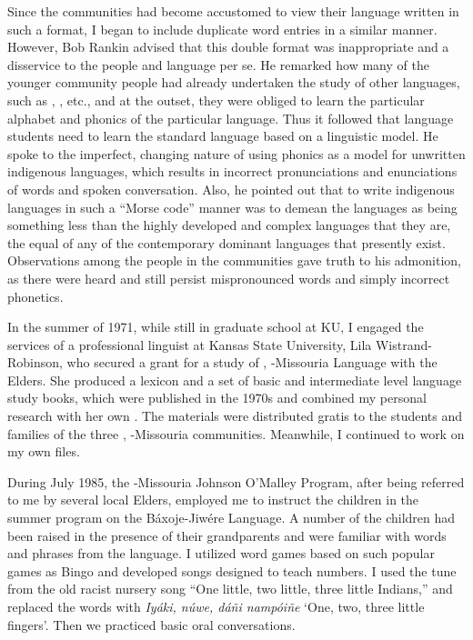 \documentclass[output=paper]{LSP/langsci}
\begin{document}
Since the communities had become accustomed to view their language written in such a format, I began to include duplicate  word entries in a similar manner. However, Bob Rankin advised that this double format was inappropriate and a disservice to the people and language per se. He remarked how many of the younger community people had already undertaken the study of other languages, such as , , etc., and at the outset, they were obliged to learn the particular alphabet and phonics of the particular language. Thus it followed that language students need to learn the standard language  based on a linguistic model. He spoke to the imperfect, changing nature of using  phonics as a model for unwritten indigenous languages, which results in incorrect pronunciations and enunciations of words and spoken conversation. Also, he pointed out that to write indigenous languages in such a ``Morse code'' manner was to demean the languages as being something less than the highly developed and complex languages that they are, the equal of any of the contemporary dominant languages that presently exist. Observations among the people in the communities gave truth to his admonition, as there were heard and still persist mispronounced words and simply incorrect phonetics. 

In the summer of 1971, while still in graduate school at KU, I engaged the services of a professional linguist at Kansas State University, Lila Wistrand-Robinson, who secured a grant for a study of , -Missouria Language with the Elders. She produced a lexicon and a set of basic and intermediate level language study books, which were published in the 1970s and combined my personal research with her own \citep{OtoeIowaWistrandRobinson1977,OtoeIowaWistrandRobinson1978}. The materials were distributed gratis to the students and families of the three , -Missouria communities. Meanwhile, I continued to work on my own  files.  

During July 1985, the -Missouria Johnson O'Malley Program, after being referred to me by several local Elders, employed me to instruct the children in the summer program on the Báxoje-Jiwére Language. A number of the children had been raised in the presence of their grandparents and were familiar with words and phrases from the language. I utilized word games based on such popular games as Bingo and developed songs designed to teach numbers. I used the tune from the old racist nursery song ``One little, two little, three little Indians,'' and replaced the words with \emph{Iyáki, núwe, dáñi nampóiñe} `One, two, three little fingers'. Then we practiced basic oral conversations.  
\end{document}
